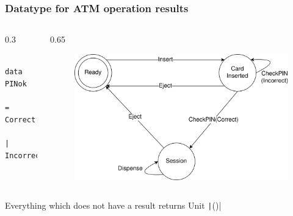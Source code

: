 \documentclass[compress,handout]{beamer}
\begin{document}
\begin{frame}[fragile]
  \frametitle{Datatype for ATM operation results}

  \begin{columns}
  \begin{column}{0.3\framewidth}
    \begin{verbatim}
      data PINok 
        = Correct
        | Incorrect
    \end{verbatim}
    \pause
  \end{column}

  \begin{column}{0.65\framewidth}
    \begin{figure}
    \includegraphics[alt={The state diagram from slide 7.},width=\textwidth]{ATM.png}
    \end{figure}
  \end{column}
  \end{columns}

  \vspace*{1cm}

  \pause

  Everything which does not have a result returns Unit {\textemdash}
  \texttt|()|

\end{frame}
\end{document}
